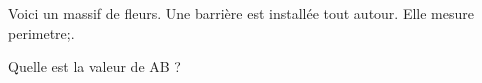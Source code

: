 \documentclass[exercice]{thedocument}%
\begin{document}
%
Voici un massif de fleurs. Une barrière est installée tout autour. Elle mesure
\<perimetre;.\par\noindent
Quelle est la valeur de AB ?\vskip5pt
{\centering{}\par}
\end{document}
